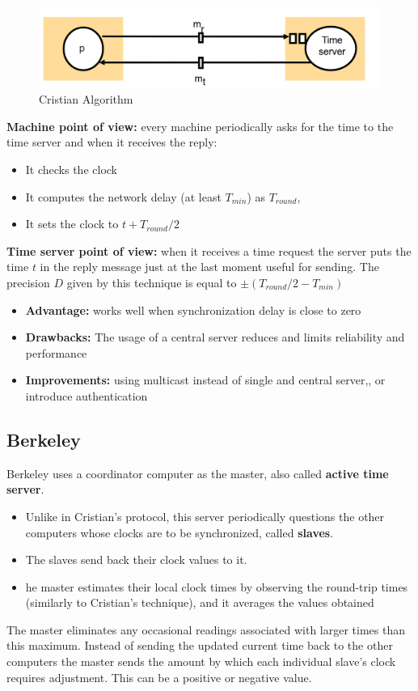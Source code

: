 \begin{figure}[!h]
    \centering
    \includegraphics[width=.60\linewidth]{images/Clock/cristianAlg.png}
    \caption{Cristian Algorithm}
\end{figure}

\textbf{Machine point of view:} every machine periodically asks for the time to the time server and when it receives the reply:
\begin{itemize}
    \item It checks the clock
    \item It computes the network delay (at least \(T_{min}\)) as \(T_{round}\), 
    \item It sets the clock to \(t + T_{round}/2\)
\end{itemize}
\textbf{Time server point of view:} when it receives a time request the server puts the
time \(t\) in the reply message just at the last moment useful for sending. The precision \(D\) given by this technique is equal to \(\pm (T_{round} / 2 - T_{min})\)
\begin{itemize}
    \item \textbf{Advantage:} works well when synchronization delay is close to zero
    \item \textbf{Drawbacks:} The usage of a central server reduces and limits reliability and performance
    \item \textbf{Improvements:} using multicast instead of single and central server,, or introduce authentication
\end{itemize}

\subsection{Berkeley}
Berkeley uses a coordinator computer as the master, also called \textbf{active time server}.
\begin{itemize}
    \item Unlike in Cristian’s protocol, this server periodically questions the other computers whose clocks are to be synchronized, called \textbf{slaves}.
    \item The slaves send back their clock values to it.
    \item he master estimates their local clock times by observing the round-trip times (similarly to Cristian’s technique), and it averages the values obtained
\end{itemize}
The master eliminates any occasional readings associated with larger times than this maximum. Instead of sending the updated current time back to the other computers the master sends the amount by which each individual slave’s clock requires adjustment. This can be a positive or negative value.

